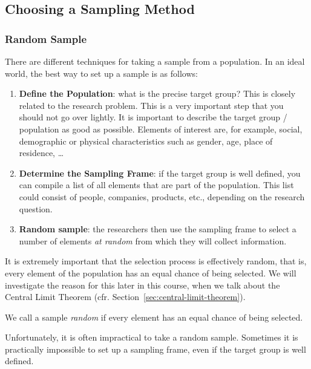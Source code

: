 \subsection{Choosing a Sampling Method}

\subsubsection{Random Sample}

There are different techniques for taking a sample from a population. In an ideal world, the best way to set up a sample is as follows:

\begin{enumerate}
    \item \textbf{Define the Population}: what is the precise target group? This is closely related to the research problem. This is a very important step that you should not go over lightly. It is important to describe the target group / population as good as possible. Elements of interest are, for example, social, demographic or physical characteristics such as gender, age, place of residence, \dots
    \item \textbf{Determine the Sampling Frame}: if the target group is well defined, you can compile a list of all elements that are part of the population. This list could consist of people, companies, products, etc., depending on the research question.
    \item \textbf{Random sample}: the researchers then use the sampling frame to select a number of elements \textit{at random} from which they will collect information.
\end{enumerate}

It is extremely important that the selection process is effectively random, that is, every element of the population has an equal chance of being selected. We will investigate the reason for this later in this course, when we talk about the Central Limit Theorem (cfr. Section~\ref{sec:central-limit-theorem}).

\begin{definition}
    We call a sample \emph{random} if every element has an equal chance of being selected.
\end{definition}

Unfortunately, it is often impractical to take a random sample. Sometimes it is practically impossible to set up a sampling frame, even if the target group is well defined.

